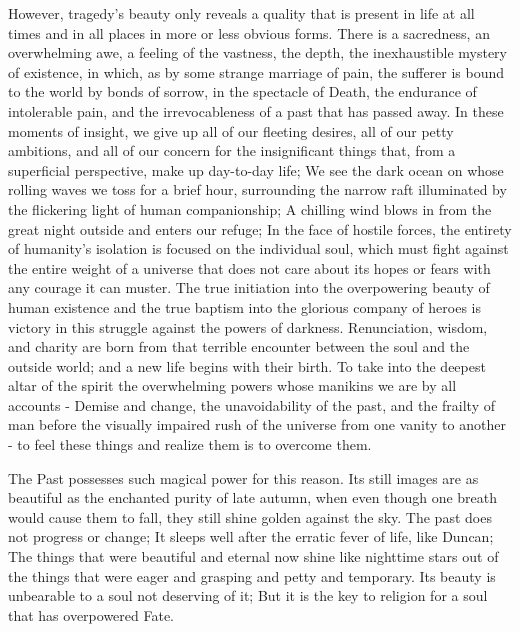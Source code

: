 \documentclass[a4paper,12pt]{book}[2004/02/16]
\theoremstyle{ilemma}
\theoremstyle{itheorem}
\theoremstyle{iother}
\theoremstyle{icorollary}
\theoremstyle{numcorollary}
\theoremstyle{idefinition}
\begin{document}
However, tragedy's beauty only reveals a quality that is present in life at all times and in all places in more or less obvious forms.
There is a sacredness, an overwhelming awe, a feeling of the vastness, the depth, the inexhaustible mystery of existence, in which, as by some strange marriage of pain, the sufferer is bound to the world by bonds of sorrow, in the spectacle of Death, the endurance of intolerable pain, and the irrevocableness of a past that has passed away. In these moments of insight, we give up all of our fleeting desires, all of our petty ambitions, and all of our concern for the insignificant things that, from a superficial perspective, make up day-to-day life; We see the dark ocean on whose rolling waves we toss for a brief hour, surrounding the narrow raft illuminated by the flickering light of human companionship; A chilling wind blows in from the great night outside and enters our refuge; In the face of hostile forces, the entirety of humanity's isolation is focused on the individual soul, which must fight against the entire weight of a universe that does not care about its hopes or fears with any courage it can muster. The true initiation into the overpowering beauty of human existence and the true baptism into the glorious company of heroes is victory in this struggle against the powers of darkness. Renunciation, wisdom, and charity are born from that terrible encounter between the soul and the outside world; and a new life begins with their birth.
To take into the deepest altar of the spirit the overwhelming powers
whose manikins we are by all accounts - Demise and change, the unavoidability of
the past, and the frailty of man before the visually impaired rush of the
universe from one vanity to another - to feel these things and realize them is
to overcome them.

The Past possesses such magical power for this reason. Its still images are as beautiful as the enchanted purity of late autumn, when even though one breath would cause them to fall, they still shine golden against the sky. The past does not progress or change; It sleeps well after the erratic fever of life, like Duncan; The things that were beautiful and eternal now shine like nighttime stars out of the things that were eager and grasping and petty and temporary. Its beauty is unbearable to a soul not deserving of it;
But it is the key to religion for a soul that has overpowered Fate.
\end{document}
